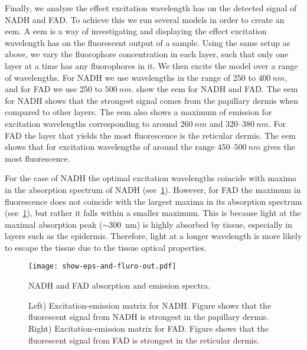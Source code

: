 Finally, we analyse the effect excitation wavelength has on the detected signal of NADH and FAD\@.
To achieve this we run several models in order to create an \gls*{eem}.
A \gls*{eem} is a way of investigating and displaying the effect excitation wavelength has on the fluorescent output of a sample.
Using the same setup as above, we vary the fluorophore concentration in each layer, such that only one layer at a time has any fluorophores in it.
We then excite the model over a range of wavelengths.
For NADH we use wavelengths in the range of 250 to $400~nm$, and for FAD we use 250 to $500~nm$.
 show the \gls*{eem} for NADH and FAD\@.
The \gls*{eem} for NADH shows that the strongest signal comes from the papillary dermis when compared to other layers.
The \gls*{eem} also shows a maximum of emission for excitation wavelengths corresponding to around $260~nm$ and $320$--$380~nm$.
For FAD the layer that yields the most fluorescence is the reticular dermis.
The \gls*{eem} shows that for excitation wavelengths of around the range $450$--$500~nm$ gives the most fluorescence.

For the case of NADH the optimal excitation wavelengths coincide with maxima in the absorption spectrum of NADH (see~\cref{fig:epsfluro}).
However, for FAD the maximum in fluorescence does not coincide with the largest maxima in its absorption spectrum (see~\cref{fig:epsfluro}), but rather it falls within a smaller maximum.
This is because light at the maximal absorption peak ($\sim$300~nm) is highly absorbed by tissue, especially in layers such as the epidermis.
Therefore, light at a longer wavelength is more likely to escape the tissue due to the tissue optical properties.

\begin{figure}[!htpb]
    \centering
    \texttt{[image: show-eps-and-fluro-out.pdf]}
    \caption{NADH and FAD absorption and emission spectra.}
    \label{fig:epsfluro}
\end{figure}

\begin{figure}[!htbp]
    \centering
    \caption{Left) Excitation-emission matrix for NADH. Figure shows that the fluorescent signal from NADH is strongest in the papillary dermis.
    Right) Excitation-emission matrix for FAD. Figure shows that the fluorescent signal from FAD is strongest in the reticular dermis.}%
    \label{fig:nadheem}%
\end{figure}

